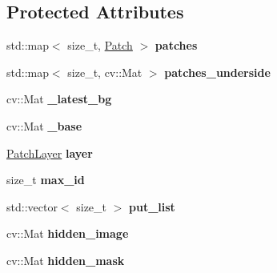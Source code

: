 \subsection*{Protected Attributes}
\begin{DoxyCompactItemize}
\item 
\hypertarget{classskl_1_1_patch_model_abb3d094d92f8d8332c5af2ba19bb08b6}{}\label{classskl_1_1_patch_model_abb3d094d92f8d8332c5af2ba19bb08b6} 
std\+::map$<$ size\+\_\+t, \hyperlink{classskl_1_1_patch}{Patch} $>$ {\bfseries patches}
\item 
\hypertarget{classskl_1_1_patch_model_aa1123ccba2f88ceadae4f527a7050d7e}{}\label{classskl_1_1_patch_model_aa1123ccba2f88ceadae4f527a7050d7e} 
std\+::map$<$ size\+\_\+t, cv\+::\+Mat $>$ {\bfseries patches\+\_\+underside}
\item 
\hypertarget{classskl_1_1_patch_model_a64d22efe5341f9a42b0f970bfd79ab02}{}\label{classskl_1_1_patch_model_a64d22efe5341f9a42b0f970bfd79ab02} 
cv\+::\+Mat {\bfseries \+\_\+latest\+\_\+bg}
\item 
\hypertarget{classskl_1_1_patch_model_a3f03f38a6e96857261840bf725548c04}{}\label{classskl_1_1_patch_model_a3f03f38a6e96857261840bf725548c04} 
cv\+::\+Mat {\bfseries \+\_\+base}
\item 
\hypertarget{classskl_1_1_patch_model_a60cc251b084acf807c48edc5b7d3cd59}{}\label{classskl_1_1_patch_model_a60cc251b084acf807c48edc5b7d3cd59} 
\hyperlink{classskl_1_1_patch_layer}{Patch\+Layer} {\bfseries layer}
\item 
\hypertarget{classskl_1_1_patch_model_aed5671d4a8d8f3e3449c2361ac0acc99}{}\label{classskl_1_1_patch_model_aed5671d4a8d8f3e3449c2361ac0acc99} 
size\+\_\+t {\bfseries max\+\_\+id}
\item 
\hypertarget{classskl_1_1_patch_model_a2e418abf9b17dae7acbfb8efb4439e91}{}\label{classskl_1_1_patch_model_a2e418abf9b17dae7acbfb8efb4439e91} 
std\+::vector$<$ size\+\_\+t $>$ {\bfseries put\+\_\+list}
\item 
\hypertarget{classskl_1_1_patch_model_a29a8acfda73d9cd90dee1e6c198235c0}{}\label{classskl_1_1_patch_model_a29a8acfda73d9cd90dee1e6c198235c0} 
cv\+::\+Mat {\bfseries hidden\+\_\+image}
\item 
\hypertarget{classskl_1_1_patch_model_a0c9e62abe8b48655f6617ce7c689b79f}{}\label{classskl_1_1_patch_model_a0c9e62abe8b48655f6617ce7c689b79f} 
cv\+::\+Mat {\bfseries hidden\+\_\+mask}
\item 
\hypertarget{classskl_1_1_patch_model_a103941995f4263a5b2de173f124d2ae1}{}\label{classskl_1_1_patch_model_a103941995f4263a5b2de173f124d2ae1} 

\end{DoxyCompactItemize}

